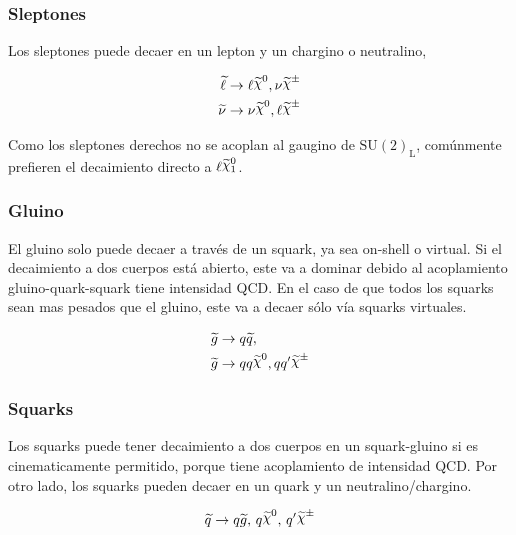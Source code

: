 \subsubsection{Sleptones}

Los sleptones puede decaer en un lepton y un chargino o neutralino,

\begin{align}
  \slepton &\to \ell \nino, \nu\chinopm \\ \snu &\to \nu\nino, \ell\chinopm
\end{align}

Como los sleptones derechos no se acoplan al gaugino de $\text{SU}(2)_\text{L}$,
comúnmente prefieren el decaimiento directo a $\ell\ninoone$.


\subsubsection{Gluino}

El gluino solo puede decaer a través de un squark, ya sea on-shell o virtual. Si
el decaimiento a dos cuerpos está abierto, este va a dominar debido al
acoplamiento gluino-quark-squark tiene intensidad QCD. En el caso de que todos
los squarks sean mas pesados que el gluino, este va a decaer sólo vía squarks
virtuales.

\begin{align}
  &\gluino \to q\susy{q}, \\
  &\gluino \to qq\nino, qq^\prime \chinopm
\end{align}


\subsubsection{Squarks}

Los squarks puede tener decaimiento a dos cuerpos en un squark-gluino si es
cinematicamente permitido, porque tiene acoplamiento de intensidad QCD. Por otro
lado, los squarks pueden decaer en un quark y un neutralino/chargino.

\begin{equation}
  \susy{q} \to q\gluino, \, q\nino, \, q^\prime \chinopm
\end{equation}



